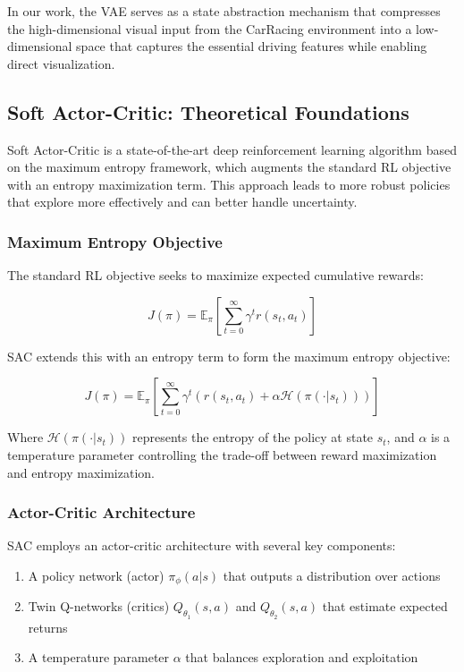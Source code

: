 \documentclass[conference]{IEEEtran}
\begin{document}
In our work, the VAE serves as a state abstraction mechanism that compresses the high-dimensional visual input from the CarRacing environment into a low-dimensional space that captures the essential driving features while enabling direct visualization.

\subsection{Soft Actor-Critic: Theoretical Foundations}

Soft Actor-Critic is a state-of-the-art deep reinforcement learning algorithm based on the maximum entropy framework, which augments the standard RL objective with an entropy maximization term. This approach leads to more robust policies that explore more effectively and can better handle uncertainty.

\subsubsection{Maximum Entropy Objective}

The standard RL objective seeks to maximize expected cumulative rewards:

\begin{equation}
J(\pi) = \mathbb{E}_{\pi}\left[\sum_{t=0}^{\infty} \gamma^t r(s_t, a_t)\right]
\end{equation}

SAC extends this with an entropy term to form the maximum entropy objective:

\begin{equation}
J(\pi) = \mathbb{E}_{\pi}\left[\sum_{t=0}^{\infty} \gamma^t \left(r(s_t, a_t) + \alpha \mathcal{H}(\pi(\cdot|s_t))\right)\right]
\end{equation}

Where $\mathcal{H}(\pi(\cdot|s_t))$ represents the entropy of the policy at state $s_t$, and $\alpha$ is a temperature parameter controlling the trade-off between reward maximization and entropy maximization.

\subsubsection{Actor-Critic Architecture}

SAC employs an actor-critic architecture with several key components:

\begin{enumerate}[label=\roman*.]
    \item A policy network (actor) $\pi_\phi(a|s)$ that outputs a distribution over actions
    \item Twin Q-networks (critics) $Q_{\theta_1}(s,a)$ and $Q_{\theta_2}(s,a)$ that estimate expected returns
    \item A temperature parameter $\alpha$ that balances exploration and exploitation
\end{enumerate}
\end{document}
